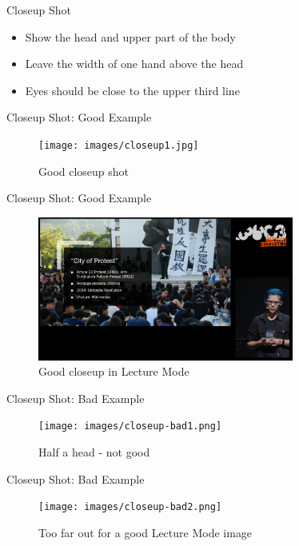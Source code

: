 
\begin{frame}{Closeup Shot}
	\begin{itemize}
		\item Show the head and upper part of the body
		\item Leave the width of one hand above the head
		\item Eyes should be close to the upper third line
	\end{itemize}
\end{frame}

\begin{frame}{Closeup Shot: Good Example}
	\begin{figure}
		\centering
		\texttt{[image: images/closeup1.jpg]}
		\caption{Good closeup shot}
	\end{figure}
\end{frame}

\begin{frame}{Closeup Shot: Good Example}
	\begin{figure}
		\centering
		\includegraphics[width=0.75\textwidth]{images/closeup2.jpg}
		\caption{Good closeup in Lecture Mode}
	\end{figure}
\end{frame}

\begin{frame}{Closeup Shot: Bad Example}
	\begin{figure}
		\centering
		\texttt{[image: images/closeup-bad1.png]}
		\caption{Half a head - not good}
	\end{figure}
\end{frame}

\begin{frame}{Closeup Shot: Bad Example}
	\begin{figure}
		\centering
		\texttt{[image: images/closeup-bad2.png]}
		\caption{Too far out for a good Lecture Mode image}
	\end{figure}
\end{frame}

